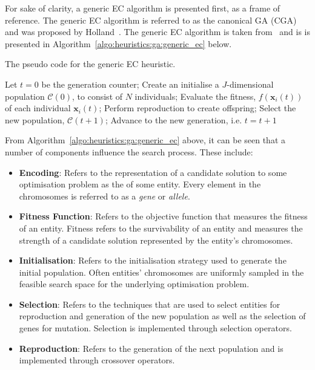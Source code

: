For sake of clarity, a generic \acs{EC} algorithm is presented first, as a frame of reference. The generic \acs{EC} algorithm is referred to as the canonical \acs{GA} (CGA) and was proposed by Holland~\cite{ref:holland:1992}. The generic \acs{EC} algorithm is taken from~\cite{ref:engelbrecht:2007} and is is presented in Algorithm~\ref{algo:heuristics:ga:generic_ec} below.

\begin{algorithm}[H]
      \caption{The pseudo code for the generic \acs{EC} heuristic.}
      \label{algo:heuristics:ga:generic_ec}
      \begin{algorithmic}
            \State Let $t = 0$ be the generation counter;
            \State Create an initialise a $J$-dimensional population $\mathcal{C}(0)$, to consist of $N$ individuals;
            \State Evaluate the fitness, $f(\boldsymbol{x}_{i}(t))$ of each individual $\boldsymbol{x}_{i}(t)$;
            \State Perform reproduction to create offspring;
            \State Select the new population, $\mathcal{C}(t+1)$;
            \State Advance to the new generation, i.e. $t = t + 1$
            \EndWhile
            \State
      \end{algorithmic}
\end{algorithm}

From Algorithm~\ref{algo:heuristics:ga:generic_ec} above, it can be seen that a number of components influence the search process. These include:

\begin{itemize}
      \item \textbf{Encoding}: Refers to the representation of a candidate solution to some optimisation problem as the  of some entity. Every element in the chromosomes is referred to as a \textit{gene} or \textit{allele}.

      \item \textbf{Fitness Function}: Refers to the objective function that measures the fitness of an entity. Fitness refers to the survivability of an entity and measures the strength of a candidate solution represented by the entity's chromosomes.

      \item \textbf{Initialisation}: Refers to the initialisation strategy used to generate the initial population. Often entities' chromosomes are uniformly sampled in the feasible search space for the underlying optimisation problem.

      \item \textbf{Selection}: Refers to the techniques that are used to select entities for reproduction and generation of the new population as well as the selection of genes for mutation. Selection is implemented through selection operators.

      \item \textbf{Reproduction}: Refers to the generation of the next population and is implemented through crossover operators.
\end{itemize}

